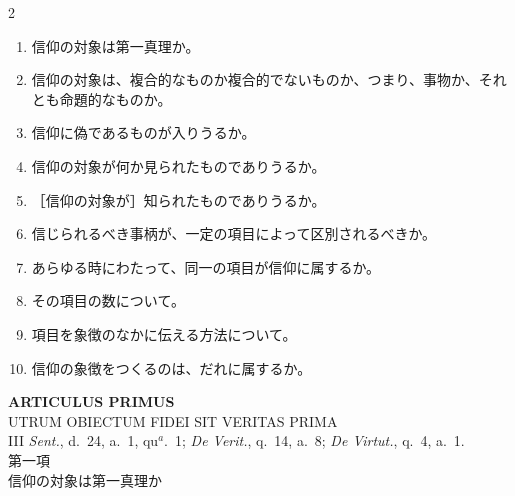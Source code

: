 \documentclass[paper=a4paper,fontsize=10pt,jafontsize=9pt,titlepage]{jlreq}
\begin{document}
\begin{paracol}{2}
\switchcolumn

\begin{enumerate}
 \item 信仰の対象は第一真理か。
 \item 信仰の対象は、複合的なものか複合的でないものか、つまり、事物か、それ
       とも命題的なものか。
 \item 信仰に偽であるものが入りうるか。
 \item 信仰の対象が何か見られたものでありうるか。
 \item ［信仰の対象が］知られたものでありうるか。
 \item 信じられるべき事柄が、一定の項目によって区別されるべきか。
 \item あらゆる時にわたって、同一の項目が信仰に属するか。
 \item その項目の数について。
 \item 項目を象徴のなかに伝える方法について。
 \item 信仰の象徴をつくるのは、だれに属するか。
\end{enumerate}

\end{paracol}

\newpage


{}
\setcounter{section}{1}
\setcounter{subsection}{0}
\begin{center}
 {\Large {\bfseries ARTICULUS PRIMUS}}\\
 {\large UTRUM OBIECTUM FIDEI SIT VERITAS PRIMA}\\
 {\footnotesize III {\itshape Sent.}, d.~24, a.~1, qu$^a$.~1; {\itshape
 De Verit.}, q.~14, a.~8; {\itshape De Virtut.}, q.~4, a.~1.}\\
 {\Large 第一項\\信仰の対象は第一真理か}
\end{center}
\end{document}
